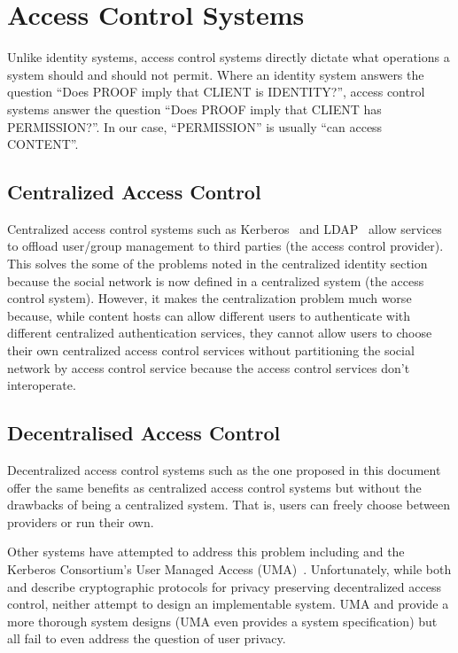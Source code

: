 \documentclass[pdftex,12pt,a4papaer]{report}
\begin{document}
\section{Access Control Systems}

Unlike identity systems, access control systems directly dictate what operations
a system should and should not permit. Where an identity system answers the
question ``Does PROOF imply that CLIENT is IDENTITY?'', access control systems
answer the question ``Does PROOF imply that CLIENT has PERMISSION?''. In our
case, ``PERMISSION'' is usually ``can access CONTENT''.

\subsection{Centralized Access Control}

Centralized access control systems such as Kerberos~\cite{kerberos} and
LDAP~\cite{ldap} allow services to offload user/group management to third
parties (the access control provider). This solves the some of the  problems noted
in the centralized identity section because the social network is now %
defined in a centralized system (the access control system). However, it makes
the centralization problem much worse because, while content hosts can allow
different users to authenticate with different centralized authentication
services, they cannot allow users to choose their own centralized
access control services without partitioning the social network by access
control service because the access control services don't interoperate.

\subsection{Decentralised Access Control}

Decentralized access control systems such as the one proposed in this document
offer the same benefits as centralized access control systems but without the
drawbacks of being a centralized system. That is, users can freely choose
between providers or run their own. 

Other systems have attempted to address this problem including \cite{attrib}
\cite{privattrib} \cite{drbac} \cite{socnet} and the Kerberos Consortium's User
Managed Access (UMA)~\cite{uma}. Unfortunately, while both \cite{attrib} and
\cite{privattrib} describe cryptographic protocols for privacy preserving
decentralized access control, neither attempt to design an implementable system.
UMA\cite{uma} \cite{drbac} and \cite{socnet} provide a more thorough system
designs (UMA even provides a system specification) but all fail to even address
the question of user privacy.
\end{document}
